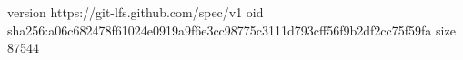 version https://git-lfs.github.com/spec/v1
oid sha256:a06c682478f61024e0919a9f6e3cc98775c3111d793cff56f9b2df2cc75f59fa
size 87544
